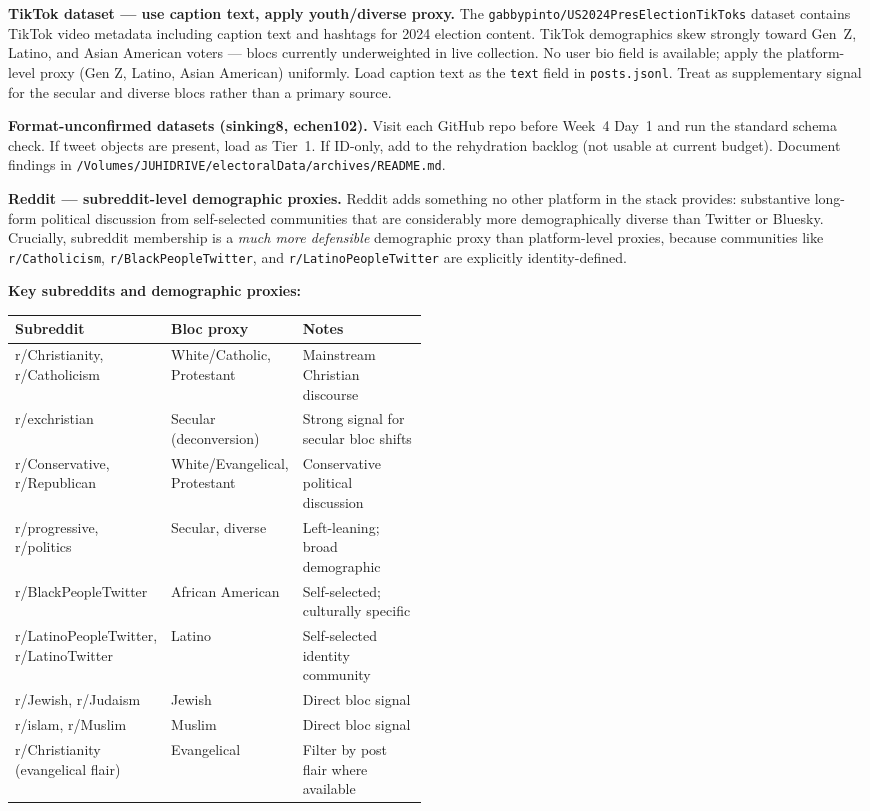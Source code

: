 \documentclass[11pt]{article}
\begin{document}
\medskip
\noindent\textbf{TikTok dataset --- use caption text, apply youth/diverse proxy.}
The \texttt{gabbypinto/US2024PresElectionTikToks} dataset contains TikTok video
metadata including caption text and hashtags for 2024 election content. TikTok
demographics skew strongly toward Gen~Z, Latino, and Asian American voters ---
blocs currently underweighted in live collection. No user bio field is available;
apply the platform-level proxy (Gen Z, Latino, Asian American) uniformly. Load caption
text as the \texttt{text} field in \texttt{posts.jsonl}. Treat as supplementary
signal for the secular and diverse blocs rather than a primary source.

\medskip
\noindent\textbf{Format-unconfirmed datasets (sinking8, echen102).}
Visit each GitHub repo before Week~4 Day~1 and run the standard schema check.
If tweet objects are present, load as Tier~1. If ID-only, add to the rehydration
backlog (not usable at current budget). Document findings in
\texttt{/Volumes/JUHIDRIVE/electoralData/archives/README.md}.

\medskip
\noindent\textbf{Reddit --- subreddit-level demographic proxies.}
Reddit adds something no other platform in the stack provides: substantive
long-form political discussion from self-selected communities that are
considerably more demographically diverse than Twitter or Bluesky.
Crucially, subreddit membership is a \emph{much more defensible} demographic
proxy than platform-level proxies, because communities like
\texttt{r/Catholicism}, \texttt{r/BlackPeopleTwitter}, and
\texttt{r/LatinoPeopleTwitter} are explicitly identity-defined.

\textbf{Key subreddits and demographic proxies:}
\begin{center}
\begin{tabularx}{\linewidth}{p{0.28\linewidth}p{0.20\linewidth}X}
\toprule
\textbf{Subreddit} & \textbf{Bloc proxy} & \textbf{Notes} \\
\midrule
r/Christianity, r/Catholicism & White/Catholic, Protestant & Mainstream Christian discourse \\
r/exchristian & Secular (deconversion) & Strong signal for secular bloc shifts \\
r/Conservative, r/Republican & White/Evangelical, Protestant & Conservative political discussion \\
r/progressive, r/politics & Secular, diverse & Left-leaning; broad demographic \\
r/BlackPeopleTwitter & African American & Self-selected; culturally specific \\
r/LatinoPeopleTwitter, r/LatinoTwitter & Latino & Self-selected identity community \\
r/Jewish, r/Judaism & Jewish & Direct bloc signal \\
r/islam, r/Muslim & Muslim & Direct bloc signal \\
r/Christianity (evangelical flair) & Evangelical & Filter by post flair where available \\
\bottomrule
\end{tabularx}
\end{center}
\end{document}
